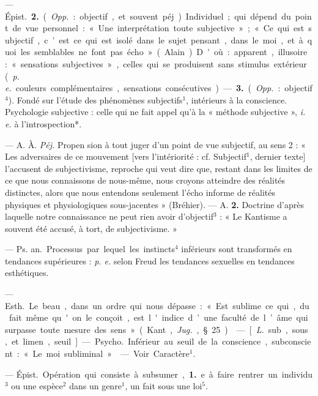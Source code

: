 \begin{itemize}[leftmargin=1cm, label=, itemsep=1pt]
— \si{Épist.} {\bf 2.} ({\it Opp.} : objectif, et
souvent péj.) Individuel ; qui dépend
du point de vue personnel : « Une
interprétation toute subjective » ;
« Ce qui est subjectif, c’est ce qui
est isolé dans le sujet pensant, dans
le moi, et à quoi les semblables ne
font pas écho » (Alain). D'où : apparent, illusoire : « sensations subjectives », celles qui se produisent sans
stimulus extérieur ({\it p. e.} couleurs
complémentaires, sensations consécutives). — {\bf 3.} ({\it Opp.} : objectif$^4$).
Fondé sur l'étude des phénomènes
subjectifs$^1$, intérieurs à la conscience.
Psychologie subjective : celle qui ne
fait appel qu’à la « méthode subjective », {\it i. e.} à l’introspection*.

 — A. À. {\it Péj.} Propen
sion à tout juger d’un point de vue
subjectif, au sens 2 : « Les adversaires de ce mouvement [vers l’intériorité : cf. Subjectif$^1$, dernier texte]
l’accusent de subjectivisme, reproche
qui veut dire que, restant dans les
limites de ce que nous connaissons
de nous-même, nous croyons atteindre des réalités distinctes, alors
que nous entendons seulement l’écho
informe de réalités physiques
et physiologiques sous-jacentes »
(Bréhier). — A. {\bf 2.} Doctrine d’après
laquelle notre connaissance ne peut
rien avoir d’objectif$^3$ : « Le Kantisme a souvent été accusé, à tort,
de subjectivisme. »

 — \si{Ps. an.} Processus par
lequel les instincts$^4$ inférieurs sont
transformés en tendances supérieures : {\it p. e.} selon Freud les tendances sexuelles en tendances esthétiques.

 — \si{Esth.} Le beau, dans un
ordre qui nous dépasse : « Est sublime ce qui, du fait même qu'on le
conçoit, est l'indice d’une faculté de
l’âme qui surpasse toute mesure des
sens » (Kant, {\it Jug.}, § 25).

 — [{\it L.} sub, sous, et limen,
seuil]. — \si{Psycho.} Inférieur au seuil
de la conscience, subconscient : « Le
moi subliminal. »

 — Voir Caractère$^1$.

 — \si{Épist.} Opération qui
consiste à subsumer, {\bf 1.} e. à faire
rentrer un individu$^3$ ou une espèce$^2$
dans un genre$^1$, un fait sous une loi$^5$.


\end{itemize}
